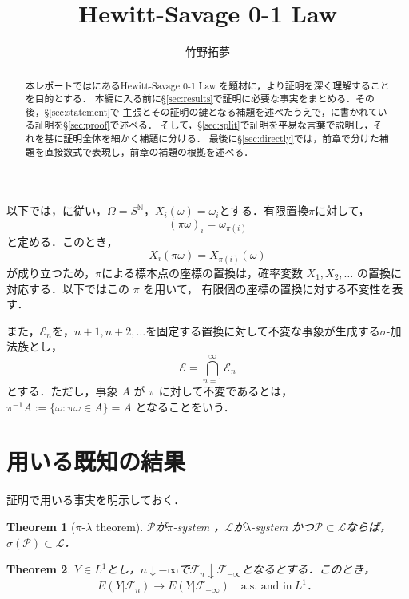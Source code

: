 \documentclass[a4paper,11pt,uplatex,dvipdfmx]{jsarticle}
\title{Hewitt-Savage 0-1 Law}
\author{竹野拓夢}
\date{}
\theoremstyle{plain}
\newtheorem{theorem}{Theorem}[section]
\theoremstyle{definition}
\begin{document}
\maketitle

\begin{abstract}
本レポートでは\cite{Durrett}にあるHewitt-Savage 0-1 Law を題材に，より証明を深く理解することを目的とする．
本編に入る前に\S\ref{sec:results}で証明に必要な事実をまとめる．その後，\S\ref{sec:statement}で
主張とその証明の鍵となる補題を述べたうえで，\cite{Durrett}に書かれている証明を\S\ref{sec:proof}で述べる．
そして，\S\ref{sec:split}で証明を平易な言葉で説明し，それを基に証明全体を細かく補題に分ける．
最後に\S\ref{sec:directly}では，前章で分けた補題を直接数式で表現し，前章の補題の根拠を述べる．
\end{abstract}

\tableofcontents

\vspace{3mm}
以下では，\cite{Durrett}に従い，$\Omega=S^{\mathbb{N}}$，$X_i(\omega)=\omega_i$とする．有限置換$\pi$に対して，
\[
  (\pi\omega)_i=\omega_{\pi(i)}
\]
と定める．このとき，
\[
  X_i(\pi\omega)=X_{\pi(i)}(\omega)
\]
が成り立つため，$\pi$による標本点の座標の置換は，確率変数 \(X_1,X_2,\ldots\) の置換に対応する．以下ではこの \(\pi\) を用いて，
有限個の座標の置換に対する不変性を表す．

また，$\mathcal{E}_n$を，$n+1,n+2,\ldots$を固定する置換に対して不変な事象が生成する$\sigma$-加法族とし，
\[
  \mathcal{E}=\bigcap_{n=1}^\infty \mathcal{E}_n
\]
とする．ただし，事象 $A$ が $\pi$ に対して不変であるとは，$\pi^{-1}A:=\{\omega:\pi\omega\in A\}=A$ となることをいう．


\section{用いる既知の結果}\label{sec:results}

証明で用いる事実を明示しておく．

\begin{theorem}[$\pi$-$\lambda$ theorem]\label{thm:pi-lambda}
$\mathcal{P}$が$\pi$-system ，$\mathcal{L}$が$\lambda$-system かつ$\mathcal{P}\subset \mathcal{L}$ならば，
$\sigma(\mathcal{P})\subset\mathcal{L}$．
\end{theorem}

\begin{theorem}\label{thm:backwards-convergence}
$Y\in L^1$とし，$n \downarrow -\infty$で$\mathcal{F}_n \downarrow \mathcal{F}_{-\infty}$となるとする．このとき，
\[E(Y |\mathcal{F}_n) \longrightarrow E(Y |\mathcal{F}_{-\infty}) \quad \text{a.s. and in} \ L^1．\]
\end{theorem}
\end{document}
